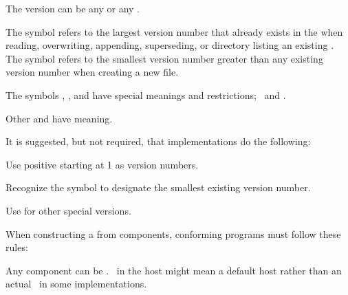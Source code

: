 \endsubsubsubsection%


The version can be any  or any .  

The symbol  refers to the largest version number 
that already exists in the 
when reading, overwriting, appending, superseding, or directory listing 
an existing .
The symbol  refers to the smallest version number
greater than any existing version number when creating a new file.

The symbols \nil, , and  have special meanings and
restrictions; \seesection\SpecialComponentValues\ and \secref\ConstructingPathnames.

Other  and 
have  meaning.

\endsubsubsubsection%


It is suggested, but not required, that implementations do the following:

\beginlist

\itemitem{\bull} Use positive  starting at 1 as version numbers.

\itemitem{\bull} Recognize the symbol 
		 to designate the smallest existing version number.

\itemitem{\bull} Use  for other special versions.

\endlist

\endsubsubsubsection%

\endsubsubsection%


  When constructing a  from components, conforming programs
  must follow these rules:
  
\beginlist

\itemitem{\bull}
  Any component can be \nil.
  \nil\ in the host might mean a default host 
  rather than an actual \nil\ in some implementations.
           
